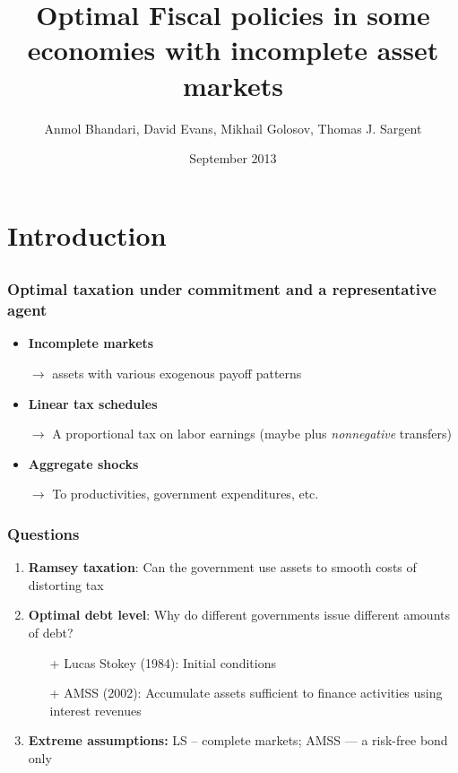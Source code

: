 \documentclass{beamer}
\title { Optimal Fiscal policies in some economies with incomplete asset markets}
\author{Anmol Bhandari, David Evans, Mikhail Golosov, Thomas J. Sargent}
\date{September 2013}
\begin{document}
%
\begin{frame}
\titlepage

\end{frame}
\section{Introduction}
\subsection{}
\begin{frame}
\frametitle{Optimal taxation under commitment and a representative agent}
 
\begin{itemize}

 \item \textbf{Incomplete markets}

 \quad \color{red}$\rightarrow$ \color{black} assets with various exogenous payoff patterns

 \item \textbf{Linear tax schedules}

 \quad \color{red}$\rightarrow$ \color{black}A proportional tax on labor earnings (maybe plus {\em nonnegative} transfers)

 \item \textbf{Aggregate shocks}

 \quad \color{red}$\rightarrow$ \color{black} To productivities, government expenditures,  etc.

 \end{itemize}
\end{frame}



\begin{frame}
\frametitle{Questions}

\begin{enumerate}
\item \textbf{Ramsey taxation}: Can the government use assets to smooth  costs of distorting tax
\item \textbf{Optimal debt level}: Why do different governments issue different amounts of debt?
\begin{itemize}
 \item [+] Lucas Stokey (1984): Initial conditions
 \item [+ ] AMSS (2002): Accumulate assets sufficient to finance activities using interest revenues
\end{itemize}
\item \textbf{Extreme assumptions:}  LS -- complete markets; AMSS --- a risk-free bond only
\end{enumerate}
\end{frame}
\end{document}

